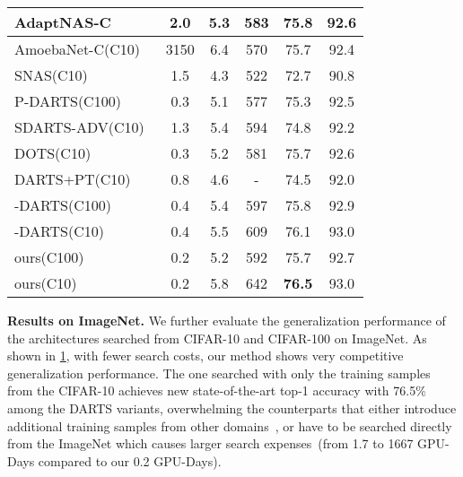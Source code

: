 \documentclass[10pt,twocolumn,letterpaper]{article}
\newcommand{\mypara}[1]{\vspace{1mm}\noindent\textbf{#1}}
\begin{document}
\begin{table}
{\begin{tabular}{lccccc}
    AdaptNAS-C~\cite{Li_2020_AdaptNAS_nips}                                       & 2.0           & 5.3       & 583     & 75.8    & 92.6    \\ 
    \midrule
    AmoebaNet-C(C10)~\cite{Real_Aggarwal_Huang_Le_2019_AmoebaNet}                                      & 3150          & 6.4       & 570     & 75.7    & 92.4   \\
    SNAS(C10)~\cite{xie2018snas}                                             & 1.5           & 4.3       & 522     & 72.7    & 90.8   \\
    P-DARTS(C100)~\cite{Chen_2019_pdarts}                                         & 0.3           & 5.1       & 577     & 75.3    & 92.5   \\
    SDARTS-ADV(C10)~\cite{chen_2020_sdarts}                                       & 1.3           & 5.4       & 594     & 74.8    & 92.2   \\
    DOTS(C10)~\cite{Gu_2021_dots}                                             & 0.3           & 5.2       & 581     & 75.7    & 92.6   \\
    DARTS+PT(C10)~\cite{wang_2021_rethinking}                                         & 0.8           & 4.6       & -       & 74.5    & 92.0    \\
    -DARTS(C100)~\cite{ye_2022_beta}                    & 0.4                           & 5.4       & 597     & 75.8    & 92.9     \\
    -DARTS(C10)~\cite{ye_2022_beta}                    & 0.4                           & 5.5       & 609     & 76.1    & 93.0     \\
    \midrule
    ours(C100)                                            & 0.2           & 5.2       & 592     &  75.7   & 92.7 \\       
    ours(C10)                                             & 0.2           & 5.8       & 642     &  \textbf{76.5}   & 93.0     \\  
    \bottomrule
  \end{tabular}
  }
  \label{tab:results_img}
  \vspace{-6pt}
\end{table} 
\mypara{Results on ImageNet.}
We further evaluate the generalization performance of the architectures searched from CIFAR-10 and CIFAR-100 on ImageNet.
As shown in \cref{tab:results_img}, with fewer search costs, our method shows very competitive generalization performance.
The one searched with only the training samples from the CIFAR-10 achieves new state-of-the-art top-1 accuracy with 76.5\% among the DARTS variants, 
overwhelming the counterparts that either introduce additional training samples from other domains~\cite{Li_2020_AdaptNAS_nips}, 
or have to be searched directly from the ImageNet which causes larger search expenses~(from 1.7 to 1667 GPU-Days compared to our 0.2 GPU-Days).
\end{document}

